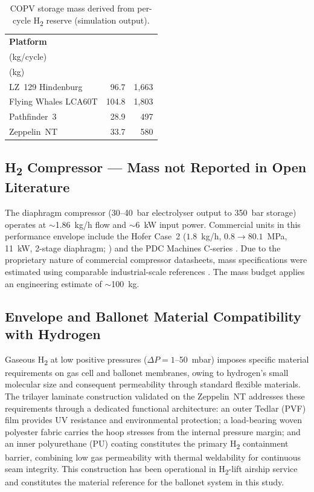 \documentclass[applsci,article,submit,pdftex,moreauthors]{Definitions/mdpi}
\begin{document}
\begin{table}[H]
\centering
\footnotesize
\caption{COPV storage mass derived from per-cycle H\textsubscript{2} reserve (simulation output).}
\label{tab:copv_bounds}
\renewcommand{\arraystretch}{1.15}
\begin{tabular}{@{} l r r @{}}
\toprule
\textbf{Platform} & \makecell{\textbf{H\textsubscript{2} reserve}\\(kg/cycle)} & \makecell{\textbf{COPV mass}\\(kg)} \\
\midrule
LZ~129 Hindenburg     &  96.7 & 1{,}663 \\
Flying Whales LCA60T  & 104.8 & 1{,}803 \\
Pathfinder~3          &  28.9 &   497 \\
Zeppelin~NT           &  33.7 &   580 \\
\bottomrule
\end{tabular}
\end{table}

\subsection{H\textsubscript{2} Compressor --- Mass not Reported in Open Literature}
\label{app:compressor}

The diaphragm compressor (30--40~bar electrolyser output to 350~bar storage) operates at $\sim$1.86~kg/h flow and $\sim$6~kW input power. Commercial units in this performance envelope include the Hofer Case~2 ($1.8$~kg/h, $0.8\to80.1$~MPa, 11~kW, 2-stage diaphragm; \cite{Giuffrida2025}) and the PDC Machines C-series \cite{Letsios2026}. Due to the proprietary nature of commercial compressor datasheets, mass specifications were estimated using comparable industrial-scale references \cite{Giuffrida2025}. The mass budget applies an engineering estimate of $\sim$100~kg.

\subsection{Envelope and Ballonet Material Compatibility with Hydrogen}
\label{app:envelope_materials}

Gaseous H\textsubscript{2} at low positive pressures ($\Delta P = 1$--50~mbar) imposes specific material requirements on gas cell and ballonet membranes, owing to hydrogen's small molecular size and consequent permeability through standard flexible materials. The trilayer laminate construction validated on the Zeppelin~NT \cite{Stockbridge2012Airship,Lobner2024Airships} addresses these requirements through a dedicated functional architecture: an outer Tedlar (PVF) film provides UV resistance and environmental protection; a load-bearing woven polyester fabric carries the hoop stresses from the internal pressure margin; and an inner polyurethane (PU) coating constitutes the primary H\textsubscript{2} containment barrier, combining low gas permeability with thermal weldability for continuous seam integrity. This construction has been operational in H\textsubscript{2}-lift airship service and constitutes the material reference for the ballonet system in this study.
\end{document}
